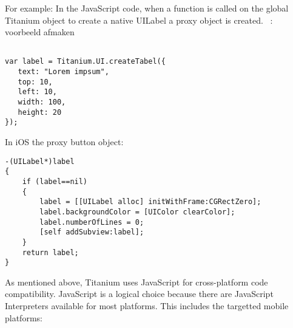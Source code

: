 For example: In the JavaScript code, when a function is called on the global Titanium object to create a native UILabel a proxy object is created.
\   : voorbeeld afmaken
\begin{verbatim}

var label = Titanium.UI.createTabel({
   text: "Lorem impsum",
   top: 10,
   left: 10,
   width: 100,
   height: 20
});
\end{verbatim}


In iOS the proxy button object:

\begin{verbatim}
-(UILabel*)label
{
    if (label==nil)
    {
        label = [[UILabel alloc] initWithFrame:CGRectZero];
        label.backgroundColor = [UIColor clearColor];
        label.numberOfLines = 0;
        [self addSubview:label];
    }
    return label;
}
\end{verbatim}



As mentioned above, Titanium uses JavaScript for cross-platform code compatibility. JavaScript is a logical choice because there are JavaScript Interpreters available for most platforms. This includes the targetted mobile platforms:

